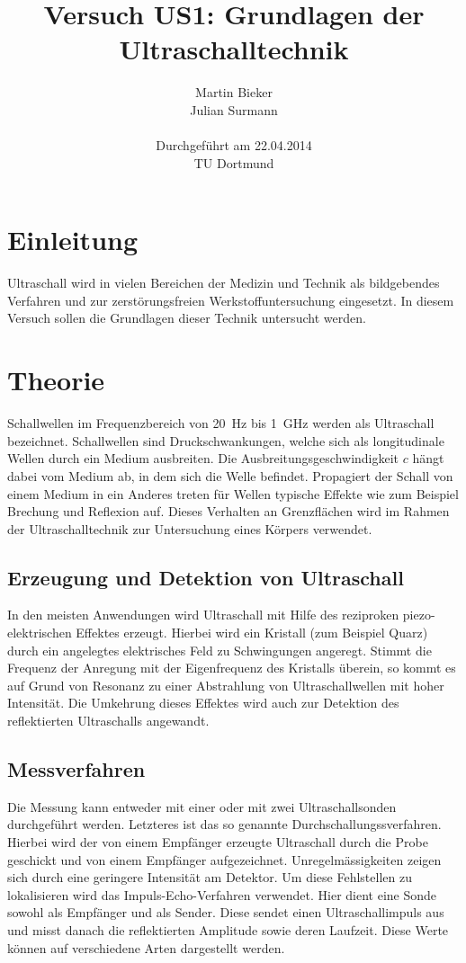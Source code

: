 \documentclass[11pt,ngerman,a4paper]{article}
\title{\textbf{Versuch US1: Grundlagen der Ultraschalltechnik}}
\author{Martin Bieker\\
		Julian Surmann\\
		\\
		Durchgef\"{u}hrt am 22.04.2014\\
		TU Dortmund}
\date{}
\begin{document}
\renewcommand\tablename{Tabelle}
\renewcommand\figurename{Abbildung}
\maketitle
\thispagestyle{empty}
\newpage
\clearpage
\setcounter{page}{1}


\section{Einleitung}
Ultraschall wird in vielen Bereichen der Medizin und Technik als bildgebendes Verfahren und zur zerst\"orungsfreien Werkstoffuntersuchung eingesetzt. In diesem Versuch sollen die Grundlagen dieser Technik untersucht werden.
\section{Theorie}

Schallwellen im Frequenzbereich von \SI{20}{\hertz} bis \SI{1}{\giga\hertz} werden als Ultraschall bezeichnet. Schallwellen sind Druckschwankungen, welche sich als longitudinale Wellen durch ein Medium ausbreiten. Die Ausbreitungsgeschwindigkeit $c$ h\"angt dabei vom Medium ab, in dem sich die Welle befindet. Propagiert der Schall von einem Medium in ein Anderes treten f\"ur Wellen typische Effekte wie zum Beispiel Brechung und Reflexion auf. Dieses Verhalten an Grenzfl\"achen wird im Rahmen der Ultraschalltechnik zur Untersuchung eines K\"orpers verwendet. 
\subsection{Erzeugung und Detektion von Ultraschall}
In den meisten Anwendungen wird Ultraschall mit Hilfe des reziproken piezo-elektrischen Effektes erzeugt. Hierbei wird ein Kristall (zum Beispiel Quarz) durch ein angelegtes elektrisches Feld zu Schwingungen angeregt. Stimmt die Frequenz der Anregung mit der Eigenfrequenz des Kristalls \"uberein, so kommt es auf Grund von Resonanz zu einer Abstrahlung von Ultraschallwellen mit hoher Intensit\"at.  Die Umkehrung dieses Effektes wird auch zur Detektion des reflektierten Ultraschalls angewandt.
\subsection{Messverfahren} 
Die Messung kann entweder mit einer oder mit zwei Ultraschallsonden durchgef\"uhrt werden. Letzteres ist das so genannte Durchschallungssverfahren. Hierbei wird der von einem Empf\"anger erzeugte Ultraschall durch die Probe geschickt und von einem Empf\"anger aufgezeichnet. Unregelm\"assigkeiten zeigen sich durch eine geringere Intensit\"at am Detektor. Um diese Fehlstellen zu lokalisieren wird das Impuls-Echo-Verfahren verwendet. Hier dient eine Sonde sowohl als Empf\"anger und als Sender. Diese sendet einen Ultraschallimpuls aus und misst danach die reflektierten Amplitude sowie deren Laufzeit. Diese Werte k\"onnen auf verschiedene Arten dargestellt werden.
\end{document}
